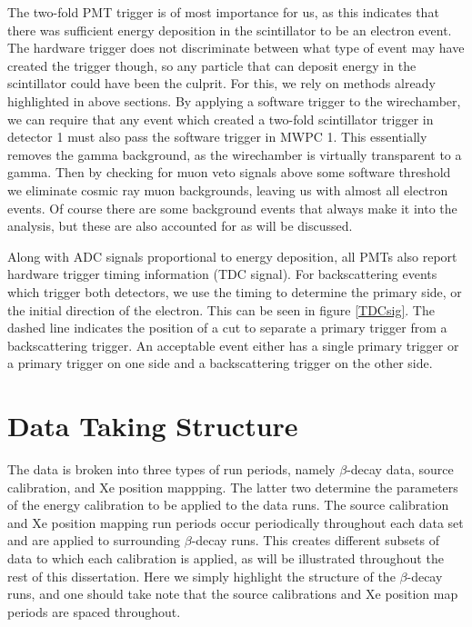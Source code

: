 
The two-fold PMT trigger is of most importance for us, as this indicates
that there was sufficient energy deposition in the scintillator to be an electron event.
The hardware trigger does not
discriminate between what type of event may have created the trigger though, so any particle
that can deposit energy in the scintillator could have been the culprit. For this, we rely
on methods already highlighted in above sections. By applying a software trigger to
the wirechamber, we can require that any event which created a two-fold scintillator trigger
in detector 1 must also pass the software trigger in MWPC 1. This essentially removes the
gamma background, as the wirechamber is virtually transparent to a gamma.
Then by checking for muon veto signals above some software threshold we eliminate
cosmic ray muon backgrounds, leaving us with almost all electron events. Of course there are
some background events that always make it into the analysis, but these are also accounted for
as will be discussed.

Along with ADC signals proportional to energy deposition, all PMTs also report hardware trigger
timing information (TDC signal). For backscattering events which trigger both detectors, we use the timing
to determine the primary side, or the initial direction of the electron. This can be seen in
figure \ref{TDCsig}. The dashed line indicates the position of a cut to separate a primary trigger
from a backscattering trigger. An acceptable event either has a single primary trigger or a primary
trigger on one side and a backscattering trigger on the other side. 





\section{Data Taking Structure}

The data is broken into three types of run periods, namely $\beta$-decay data, source calibration, and
Xe position mappping. The latter two determine the parameters of the energy calibration to be
applied to the data runs. The source calibration and Xe position mapping run periods
occur periodically throughout each data set and are applied to surrounding $\beta$-decay runs. This
creates different subsets of data to which each calibration is applied, as will be illustrated
throughout the rest of this dissertation. Here we simply highlight the structure of the
$\beta$-decay runs, and one should take note that the source calibrations and Xe position map periods
are spaced throughout.

